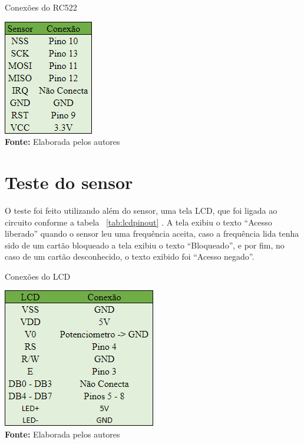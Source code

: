 \FloatBarrier
\begin{table}[!htbp]
	\centering
	\caption{Conexões do RC522}
	\includegraphics[scale=.5]{imagens/rfidpinout}
	\\ \vspace{0.2cm}
	\textbf{Fonte:} Elaborada pelos autores
	\label{tab:rfidpinout}
\end{table}
\FloatBarrier

\section{Teste do sensor}
O teste foi feito utilizando além do sensor, uma tela LCD,
que foi ligada ao circuito conforme a tabela ~\ref{tab:lcdpinout} \cite{componentes1012017}.
A tela exibiu o texto “Acesso liberado” quando o sensor leu
uma frequência aceita, caso a frequência lida tenha sido de
um cartão bloqueado a tela exibiu o texto “Bloqueado”,
e por fim, no caso de um cartão desconhecido, o texto
exibido foi “Acesso negado”.

\FloatBarrier
\begin{table}[!htbp]
	\centering
	\caption{Conexões do LCD}
	\includegraphics[scale=.5]{imagens/lcdpinout}
	\\ \vspace{0.2cm}
	\textbf{Fonte:} Elaborada pelos autores
	\label{tab:lcdpinout}
\end{table}
\FloatBarrier

